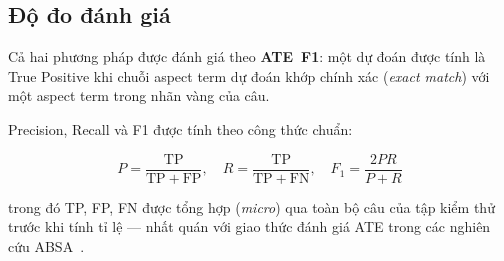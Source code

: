 \subsection{Độ đo đánh giá}
\label{subsec:ate_eval}

Cả hai phương pháp được đánh giá theo \textbf{ATE~F1}: một dự đoán
được tính là True Positive khi chuỗi aspect term dự đoán khớp chính
xác (\textit{exact match}) với một aspect term trong nhãn vàng của
câu.

Precision, Recall và F1 được tính theo công thức chuẩn:

\begin{equation}
  P = \frac{\mathrm{TP}}{\mathrm{TP} + \mathrm{FP}}, \quad
  R = \frac{\mathrm{TP}}{\mathrm{TP} + \mathrm{FN}}, \quad
  F_1 = \frac{2PR}{P + R}
  \label{eq:ate_prf}
\end{equation}

\noindent trong đó TP, FP, FN được tổng hợp (\textit{micro}) qua toàn
bộ câu của tập kiểm thử trước khi tính tỉ lệ — nhất quán với giao
thức đánh giá ATE trong các nghiên cứu ABSA~\cite{zhang2021gas,
luo2019doer}.
